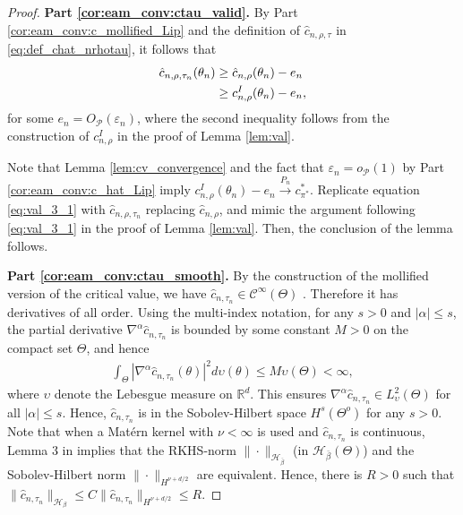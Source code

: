 \documentclass[letterpaper,11pt]{article}
\theoremstyle{myplain}
\theoremstyle{mydefinition}
\theoremstyle{myremark}
\renewcommand{\cite}{\citet}
\numberwithin{equation}{section}
\numberwithin{figure}{section}
\begin{document}
\begin{appendices}
\begin{proof}
 \textbf{Part \ref{cor:eam_conv:ctau_valid}.}
By Part \ref{cor:eam_conv:c_mollified_Lip} and the definition of $\hat c_{n,\rho,\tau}$ in \eqref{eq:def_chat_nrhotau}, it follows that
\begin{align}
\hat c_{n,\rho,\tau_n}(\theta_n)&\ge \hat c_{n,\rho}(\theta_n)-e_n\\
&\ge c^I_{n,\rho}(\theta_n)-e_n,\notag
\end{align}
for some $e_n=O_{\mathcal P}(\varepsilon_n)$, where the second inequality follows from the construction of $c^I_{n,\rho}$ in the proof of Lemma \ref{lem:val}.  






Note that  Lemma \ref{lem:cv_convergence} and the fact that $\varepsilon_n=o_{\mathcal P}(1)$ by Part \ref{cor:eam_conv:c_hat_Lip} imply $c^I_{n,\rho}(\theta_n)-e_n\stackrel{P_n}{\to} c^*_{\pi^*}.$ 
Replicate equation \eqref{eq:val_3_1} with $\hat{c}_{n,\rho,\tau_n}$ replacing $\hat{c}_{n,\rho}$, and mimic the argument following \eqref{eq:val_3_1} in the proof of Lemma \ref{lem:val}. Then, the conclusion of the lemma follows.

 \textbf{Part \ref{cor:eam_conv:ctau_smooth}.}
By the construction of the mollified version of the critical value, we have
$\hat{c}_{n,\tau_n}\in \mathcal C^\infty(\Theta)$ \citep[][Theorem 2.29]{Adams:2003aa}. Therefore it has derivatives of all order.
Using the multi-index notation, for any $s>0$ and $|\alpha|\le s$,
the partial derivative $\nabla^\alpha \hat{c}_{n,\tau_n}$ is bounded by some constant $M>0$ on the compact set $\Theta$, and hence 
\begin{align*}
\int_{\Theta} |\nabla^\alpha \hat{c}_{n,\tau_n}(\theta)|^2d\upsilon(\theta)\le M\upsilon(\Theta)<\infty,
\end{align*}
where $\upsilon$ denote the Lebesgue measure on $\mathbb R^d.$
This ensures $\nabla^\alpha \hat{c}_{n,\tau_n}\in L^2_\upsilon(\Theta)$ for all $|\alpha|\le s$. Hence, $\hat{c}_{n,\tau_n}$ is in the Sobolev-Hilbert space $H^{s}(\Theta^o)$ for any $s>0$. 
Note that when a Mat\'{e}rn kernel with $\nu<\infty$ is used and
 $\hat{c}_{n,\tau_n}$ is continuous,
 Lemma 3 in \cite{Bull_Convergence_2011} implies that the RKHS-norm $\| \cdot\|_{\mathcal H_{\bar\beta}}$ (in $\mathcal H_{\bar\beta}( \Theta)$)  and the Sobolev-Hilbert norm $\|\cdot\|_{H^{\nu+d/2}}$ are equivalent.
  Hence, there is  $R>0$ such that $\|\hat c_{n,\tau_n}\|_{\mathcal H_\beta}\le C\|\hat c_{n,\tau_n}\|_{H^{\nu+d/2}}\le R$.
  

\end{proof}
\end{appendices}
\end{document}
